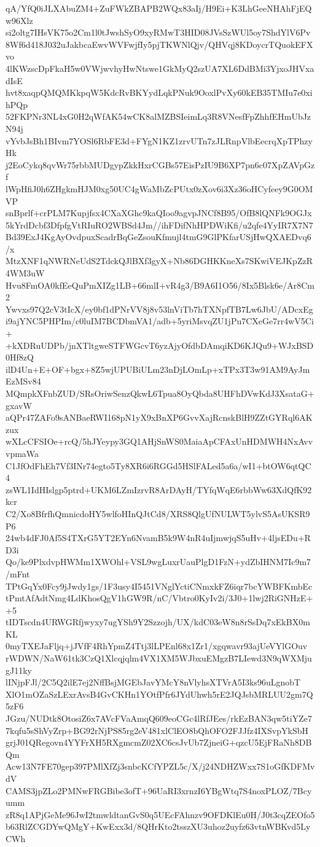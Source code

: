 qA/YfQ0iJLXAbuZM4+ZuFWkZBAPB2WQx83aIj/H9Ei+K3LhGeeNHAhFjEQw96Xlz
si2oltg7IHsVK75o2Cm1l0tJwshSyO9xyRMwT3HID08JVsSzWUl5oy7ShdYlV6Pv
8Wf6d418J032uJakbcaEwvWVFwjfIy5pjTKWNlQjv/QHVqj8KDoycrTQuokEFXvo
4lKWzscDpFkaH5w0VWjwvhyHwNtswe1GkMyQ2szUA7XL6DdBMi3YjxoJHVxadIsE
hvt8xaqpQMQMKkpqW5KdcRvBKYydLqkPNuk9OoxlPvXy60kEB35TMIu7e0xihPQp
52FKPNr3NL4xG0H2qWfAK54wCK8alMZBSIeimLq3R8VNesfFpZhhfEHmUbJzN94j
vYvbJsBh1BIvm7YOSl6RbFE3d+FYgN1KZ1zrvUTn7zJLRnpVlbEecrqXpTPhzyHk
j2EoCykq8qvWr75rbbMUDgypZkkHxrCGBs57EisPzIU9B6XP7pn6c07XpZAVpGzf
lWpHfiJ0h6ZHgkmHJM0xg50UC4gWaMbZcPUtx0zXov6i3Xz36oHCyfeey9G0OMVP
snBprlf+crPLM7Kupjfsx4CXaXGhc9kaQIoo9agvpJNCf8B95/OfB8lQNFk9OGJx
5kYrdDcbf3DfpfgVtRIuRO2WBSd4Jm//ihFDifNhHPDWiKfi/u2qfe4YyIR7X7N7
Bd39ExJ4KgAyOvdpuxScadrBqGeZsouKfmujl4tmG9GlPKfarUSjHwQXAEDvq6/x
MtzXNF1qNWRNeUdS2TdckQJlBXf3gyX+Nb86DGHKKneXs7SKwiVEJKpZzR4WM3uW
Hvu8FmOA0kfEeQuPmXIZg1LB+66mlI+vR4g3/B9A6I1O56/8Ix5Blsk6e/Ar8Cm2
Ywvxs97Q2cV3tIcX/ey0bf1dPNrVV8j8v53lnViTb7hTXNpfTB7Lw6JbU/ADcxEg
i9ajYNC5PHPIm/c0luIM7BCDbmVA1/adb+5yriMsvqZU1jPu7CXeGe7rr4wV5Ci+
+kXDRuUDPb/jnXTltgweSTFWGcvT6yzAjyOfdbDAmqiKD6KJQu9+WJxBSD0Hf8zQ
ilD4Un+E+OF+bgx+8Z5wjUPUBiULm23nDjLOmLp+xTPx3T3w91AM9AyJmEzMSv84
MQmpkXFnbZUD/SRsOriwSenzQkwL6Tpua8OyQbda8UHFhDVwKdJ3XsataG+gxavW
aQPr47ZAFo9sANBaeRWI168pN1yX9xBnXP6GvvXajRcnskBlH9ZZtGYRql6AKzux
wXLcCFSIOe+rcQ/5hJYeypy3GQ1AHjSnWS0MaiaApCFAxUnHDMWH4NxAvvvpmaWa
C1JfOdFhEh7Vf3INr74egto5Ty8XR6i6RGGd5HSlFALed5a6a/wI1+btOW6qtQC4
zsWL1IdHIslgp5ptrd+UKM6LZmIzrvR8ArDAyH/TYfqWqE6rbbWw63XdQfK92kcr
C2/Xo8BfrfhQmnicdoHY5wlfoHInQJtCd8/XRS8QlgUfNULWT5ylvS5AsUKSR9P6
24wb4dFJ0Af5S4TXrG5YT2EYn6NvamB5k9W4nR4uIjmwjqS5uHv+4ljsEDu+RD3i
Qo/ke9PlxdvpHWMm1XWOhl+VSL9wgLuxrUauPlgD1FzN+ydZbIHNM7Ic9m7/mFnt
TPtGqYx0Fcy9jJwdy1gs/1F3usy4I5451VNglYctiCNmxkFZ6iqr7bcYWBFKmbEc
tPmtAfAdtNmg4LdKhosQgV1hGW9R/nC/Vbtro0KyIv2i/3J0+1lwj2RiGNHzE++5
tIDTscdn4URWGRfjwyxy7ugYSh9Y2Szzojh/UX/kdC03eW8n8rSsDq7xEkBX0mKL
0myTXEJaFljq+jJVfF4RhYpmZ4Ttj3lLPEnl68x1Zr1/xgqwavr93ajUeVYlGOuv
rWDWN/NaW61tk3CzQ1Xlcqjqlm4VX1XM5WJbxuEMgzB7LIewd3N9qWXMjugJ11ky
lINjpFJl/2C5Q2ilE7ej2NffBsjMGEbJavYMcY8nVlyhsXTVrA5I3ks96uLgnobT
XlO1mOZaSzLExrAvsB4GvCKHn1YOtfPfr6JYdUhwh5rE2JQJsbMRLUU2gm7Q5zF6
JGzu/NUDtk8OtosiZ6x7AVcFVaAmqQ609eoCGc4lRfJEes/rkEzBAN3qw5tiYZe7
7kqfu5sShVyZrp+BG92rNjPS85rg2eV481xlClEO8bQhOFO2FJJfz4IXSvpYkSbH
grjJ01QRegovn4YYFrXH5RXgmcmZ02XC6csJvUb7ZjneiG+qzcU5EjFRaNh8DBQm
Acw13N7FE70gep397PMlXfZj3snbcKCfYPZL5c/X/j24NDHZWxx7S1oGfKDFMvdV
CAMS3jpZLo2PMNwFRGBibe3ofT+96UaRI3xrnzI6YBgWtq7S4noxPLOZ/7Bcyumm
zR8q1APjGeMe96JwI2tmwldtanGvS0q5UEcFAhnzv9OFDKlEu0H/J0t3cqZEOfo5
b63RlZCGDYwQMgY+KwExx3d/8QHrKto2tsszXU3uhoz2uyfz63vtnWBKvd5LyCWh
